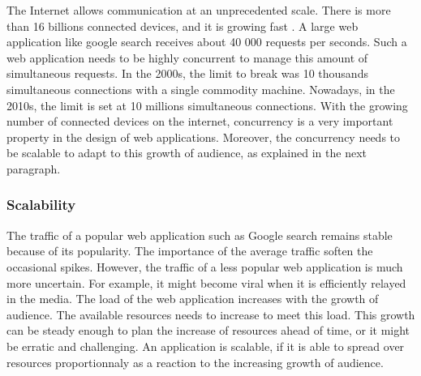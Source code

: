 The Internet allows communication at an unprecedented scale.
There is more than 16 billions connected devices, and it is growing fast \cite{Hilbert2011}.
A large web application like google search receives about 40 000 requests per seconds.
Such a web application needs to be highly concurrent to manage this amount of simultaneous requests.
In the 2000s, the limit to break was 10 thousands simultaneous connections with a single commodity machine.
Nowadays, in the 2010s, the limit is set at 10 millions simultaneous connections.
With the growing number of connected devices on the internet, concurrency is a very important property in the design of web applications.
Moreover, the concurrency needs to be scalable to adapt to this growth of audience, as explained in the next paragraph.

\subsubsection{Scalability}

The traffic of a popular web application such as Google search remains stable because of its popularity.
The importance of the average traffic soften the occasional spikes.
However, the traffic of a less popular web application is much more uncertain.
For example, it might become viral when it is efficiently relayed in the media.
The load of the web application increases with the growth of audience.
The available resources needs to increase to meet this load.
This growth can be steady enough to plan the increase of resources ahead of time, or it might be erratic and challenging.
An application is scalable, if it is able to spread over resources proportionnaly as a reaction to the increasing growth of audience.

